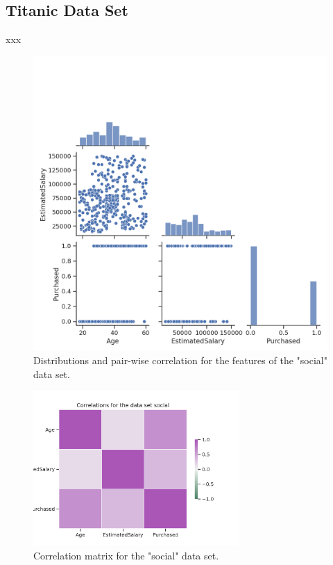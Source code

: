 \documentclass{article}
\begin{document}
\subsection{Titanic Data Set} 
xxx

\begin{figure}[h!]
	\centering
	\includegraphics[width=\textwidth]{../plots/social_pairplot.png}
	\caption{ Distributions and pair-wise correlation for the features of the "social" data set.}
	\label{pairplot_income}
\end{figure}


\begin{figure}[h!]
	\centering
	\includegraphics[width=0.7\textwidth]{../plots/social_correlations.png}
	\caption{Correlation matrix for the "social" data set. }
	\label{correlation_income}
\end{figure}
\end{document}
